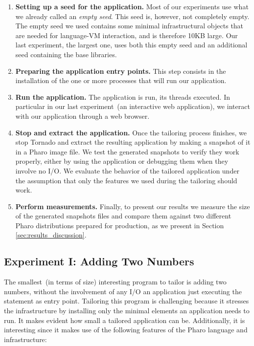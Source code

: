 \begin{enumerate}
\item \textbf{Setting up a seed for the application.} Most of our experiments use what we already called an \emph{empty seed}. This seed is, however, not completely empty. The empty seed we used contains some minimal infrastructural objects that are needed for language-VM interaction, and is therefore 10KB large. Our last experiment, the largest one, uses both this empty seed and an additional seed containing the base libraries. 
\item \textbf{Preparing the application entry points.} This step consists in the installation of the one or more processes that will run our application.
\item \textbf{Run the application.} The application is run, its threads executed. In particular in our last experiment~(an interactive web application), we interact with our application through a web browser. 
\item \textbf{Stop and extract the application.} Once the tailoring process finishes, we stop Tornado and extract the resulting application by making a snapshot of it in a Pharo image file. We test the generated snapshots to verify they work properly, either by using the application or debugging them when they involve no I/O. We evaluate the behavior of the tailored application under the assumption that only the features we used during the tailoring should work.
\item \textbf{Perform measurements.} Finally, to present our results we measure the size of the generated snapshots files and compare them against two different Pharo distributions prepared for production, as we present in Section \ref{sec:results_discussion}.
\end{enumerate}

\subsection{Experiment I: Adding Two Numbers}

The smallest~(in terms of size) interesting program to tailor is adding two numbers, without the involvement of any I/O \ie an application just executing the  statement as entry point. Tailoring this program is challenging because it stresses the infrastructure by installing only the minimal elements an application needs to run. It makes evident how small a tailored application can be. Additionally, it is interesting since it makes use of the following features of the Pharo language and infrastructure:

